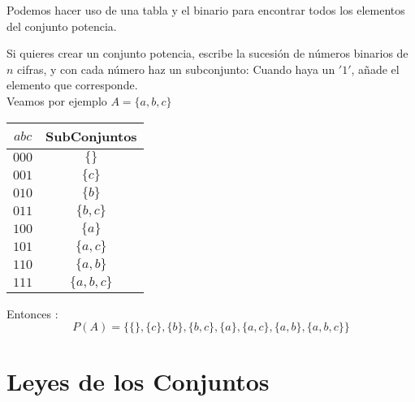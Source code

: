 \documentclass[12pt]{report}                                    %
\begin{document}
                    Podemos hacer uso de una tabla y el binario para encontrar todos los
                    elementos del conjunto potencia.

                    Si quieres crear un conjunto potencia, escribe la sucesión de números binarios de $n$ cifras,
                    y con cada número haz un subconjunto: Cuando haya un $'1'$, añade el elemento que corresponde.\\

                    Veamos por ejemplo $A = \{a, b, c\}$ \\


                    \begin{tabular}{c | c  }
                       $a b c$ & SubConjuntos       \\
                       \midrule
                      
                       $0 0 0$ &  $\{ \}$           \\
                       $0 0 1$ &  $\{ c \}$         \\
                       $0 1 0$ &  $\{ b \}$         \\
                       $0 1 1$ &  $\{ b, c \}$      \\
                       $1 0 0$ &  $\{ a \}$         \\
                       $1 0 1$ &  $\{ a, c \}$      \\
                       $1 1 0$ &  $\{ a, b \}$      \\
                       $1 1 1$ &  $\{ a, b, c \}$   \\
                     
                    \end{tabular}

                    Entonces : 
                    \begin{equation*}
                        P(A) = 
                        \{
                            \{ \}, \{ c \}, \{ b \}, \{ b, c \}, 
                            \{ a \}, \{ a, c \}, \{ a, b \}, \{ a, b, c \}
                        \}
                    \end{equation*}



        \clearpage
        \section{Leyes de los Conjuntos}
                
\end{document}
